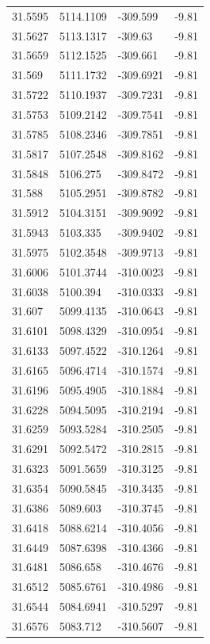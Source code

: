 \begin{table}[H]
\begin{tabular}{llll}
31.5595 & 5114.1109 & -309.599 & -9.81 \\
31.5627 & 5113.1317 & -309.63 & -9.81 \\
31.5659 & 5112.1525 & -309.661 & -9.81 \\
31.569 & 5111.1732 & -309.6921 & -9.81 \\
31.5722 & 5110.1937 & -309.7231 & -9.81 \\
31.5753 & 5109.2142 & -309.7541 & -9.81 \\
31.5785 & 5108.2346 & -309.7851 & -9.81 \\
31.5817 & 5107.2548 & -309.8162 & -9.81 \\
31.5848 & 5106.275 & -309.8472 & -9.81 \\
31.588 & 5105.2951 & -309.8782 & -9.81 \\
31.5912 & 5104.3151 & -309.9092 & -9.81 \\
31.5943 & 5103.335 & -309.9402 & -9.81 \\
31.5975 & 5102.3548 & -309.9713 & -9.81 \\
31.6006 & 5101.3744 & -310.0023 & -9.81 \\
31.6038 & 5100.394 & -310.0333 & -9.81 \\
31.607 & 5099.4135 & -310.0643 & -9.81 \\
31.6101 & 5098.4329 & -310.0954 & -9.81 \\
31.6133 & 5097.4522 & -310.1264 & -9.81 \\
31.6165 & 5096.4714 & -310.1574 & -9.81 \\
31.6196 & 5095.4905 & -310.1884 & -9.81 \\
31.6228 & 5094.5095 & -310.2194 & -9.81 \\
31.6259 & 5093.5284 & -310.2505 & -9.81 \\
31.6291 & 5092.5472 & -310.2815 & -9.81 \\
31.6323 & 5091.5659 & -310.3125 & -9.81 \\
31.6354 & 5090.5845 & -310.3435 & -9.81 \\
31.6386 & 5089.603 & -310.3745 & -9.81 \\
31.6418 & 5088.6214 & -310.4056 & -9.81 \\
31.6449 & 5087.6398 & -310.4366 & -9.81 \\
31.6481 & 5086.658 & -310.4676 & -9.81 \\
31.6512 & 5085.6761 & -310.4986 & -9.81 \\
31.6544 & 5084.6941 & -310.5297 & -9.81 \\
31.6576 & 5083.712 & -310.5607 & -9.81 \\

\end{tabular}
\end{table}
